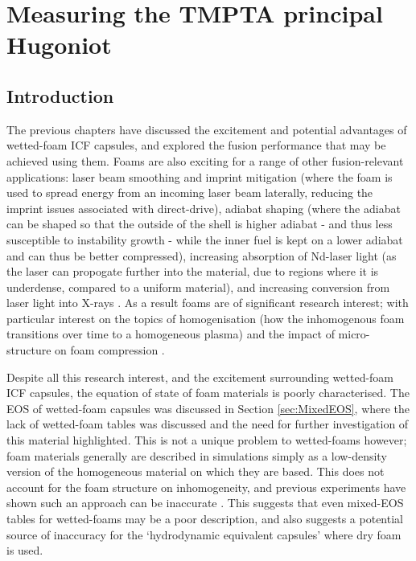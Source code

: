 

\chapter{\label{ch-experiment}Measuring the TMPTA principal Hugoniot}

\minitoc

\section{Introduction}

The previous chapters have discussed the excitement and potential advantages of wetted-foam ICF capsules, and explored the fusion performance that may be achieved using them. Foams are also exciting for a range of other fusion-relevant applications: laser beam smoothing and imprint mitigation \cite{Depierreux2009, Hu2018} (where the foam is used to spread energy from an incoming laser beam laterally, reducing the imprint issues associated with direct-drive), adiabat shaping \cite{Craxton2015, Bodner1998, Collins2005} (where the adiabat can be shaped so that the outside of the shell is higher adiabat - and thus less susceptible to instability growth - while the inner fuel is kept on a lower adiabat and can thus be better compressed), increasing absorption of Nd-laser light \cite{Skupsky2004} (as the laser can propogate further into the material, due to regions where it is underdense, compared to a uniform material), and increasing conversion from laser light into X-rays \cite{Shang2016}. As a result foams are of significant research interest; with particular interest on the topics of homogenisation (how the inhomogenous foam transitions over time to a homogeneous plasma) and the impact of micro-structure on foam compression \cite{Hazak1998, Cipriani2021, Cipriani2018a, Colvin2013}.

Despite all this research interest, and the excitement surrounding wetted-foam ICF capsules, the equation of state of foam materials is poorly characterised. The EOS of wetted-foam capsules was discussed in Section \ref{sec:MixedEOS}, where the lack of wetted-foam tables was discussed and the need for further investigation of this material highlighted. This is not a unique problem to wetted-foams however; foam materials generally are described in simulations simply as a low-density version of the homogeneous material on which they are based. This does not account for the foam structure on inhomogeneity, and previous experiments have shown such an approach can be inaccurate \cite{Nicolai2012}. This suggests that even mixed-EOS tables for wetted-foams may be a poor description, and also suggests a potential source of inaccuracy for the `hydrodynamic equivalent capsules' where dry foam is used.

